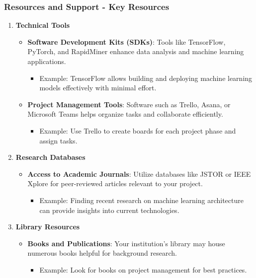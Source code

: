 \documentclass[aspectratio=169]{beamer}
\begin{document}
\begin{frame}[fragile]
    \frametitle{Resources and Support - Key Resources}
    \begin{enumerate}
        \item \textbf{Technical Tools}
        \begin{itemize}
            \item \textbf{Software Development Kits (SDKs)}: Tools like TensorFlow, PyTorch, and RapidMiner enhance data analysis and machine learning applications.
            \begin{itemize}
                \item Example: TensorFlow allows building and deploying machine learning models effectively with minimal effort.
            \end{itemize}
            \item \textbf{Project Management Tools}: Software such as Trello, Asana, or Microsoft Teams helps organize tasks and collaborate efficiently.
            \begin{itemize}
                \item Example: Use Trello to create boards for each project phase and assign tasks.
            \end{itemize}
        \end{itemize}
        
        \item \textbf{Research Databases}
        \begin{itemize}
            \item \textbf{Access to Academic Journals}: Utilize databases like JSTOR or IEEE Xplore for peer-reviewed articles relevant to your project.
            \begin{itemize}
                \item Example: Finding recent research on machine learning architecture can provide insights into current technologies.
            \end{itemize}
        \end{itemize}
        
        \item \textbf{Library Resources}
        \begin{itemize}
            \item \textbf{Books and Publications}: Your institution’s library may house numerous books helpful for background research.
            \begin{itemize}
                \item Example: Look for books on project management for best practices.
            \end{itemize}
        \end{itemize}
    \end{enumerate}
\end{frame}
\end{document}
